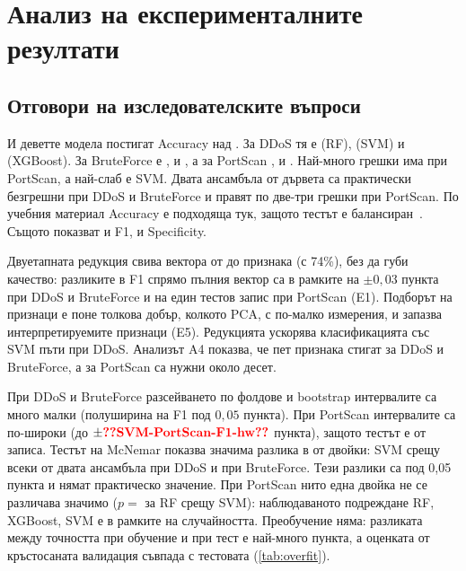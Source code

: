 \chapter{Анализ на експерименталните резултати}\label{ch:analysis}

\section{Отговори на изследователските въпроси}

\begin{keybox}
И деветте модела постигат Accuracy над . За DDoS тя е  (RF),  (SVM) и  (XGBoost). За BruteForce е ,  и , а за PortScan ,  и . Най-много грешки има при PortScan, а най-слаб е SVM. Двата ансамбъла от дървета са практически безгрешни при DDoS и BruteForce и правят по две-три грешки при PortScan. По учебния материал Accuracy е подходяща тук, защото тестът е балансиран~\cite{borovska2022}. Същото показват и F1, и Specificity.
\end{keybox}

\begin{keybox}
Двуетапната редукция свива вектора от  до  признака (с 74\%), без да губи качество: разликите в F1 спрямо пълния вектор са в рамките на $\pm0{,}03$ пункта при DDoS и BruteForce и на един тестов запис при PortScan (E1). Подборът на признаци е поне толкова добър, колкото PCA, с по-малко измерения, и запазва интерпретируемите признаци (E5). Редукцията ускорява класификацията със SVM  пъти при DDoS. Анализът A4 показва, че пет признака стигат за DDoS и BruteForce, а за PortScan са нужни около десет.
\end{keybox}

\begin{keybox}
При DDoS и BruteForce разсейването по фолдове и bootstrap интервалите са много малки (полуширина на F1 под $0{,}05$ пункта). При PortScan интервалите са по-широки (до $\pm\val{SVM-PortScan-F1-hw}$ пункта), защото тестът е от  записа. Тестът на McNemar показва значима разлика в  от  двойки: SVM срещу всеки от двата ансамбъла при DDoS и при BruteForce. Тези разлики са под 0,05 пункта и нямат практическо значение. При PortScan нито една двойка не се различава значимо ($p={}$ за RF срещу SVM): наблюдаваното подреждане RF, XGBoost, SVM е в рамките на случайността. Преобучение няма: разликата между точността при обучение и при тест е най-много  пункта, а оценката от кръстосаната валидация съвпада с тестовата (\cref{tab:overfit}).
\end{keybox}

